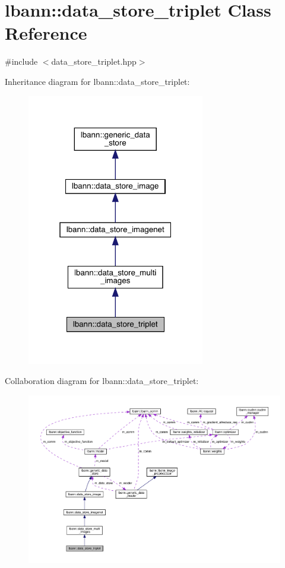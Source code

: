 \hypertarget{classlbann_1_1data__store__triplet}{}\section{lbann\+:\+:data\+\_\+store\+\_\+triplet Class Reference}
\label{classlbann_1_1data__store__triplet}


{\ttfamily \#include $<$data\+\_\+store\+\_\+triplet.\+hpp$>$}



Inheritance diagram for lbann\+:\+:data\+\_\+store\+\_\+triplet\+:\nopagebreak
\begin{figure}[H]
\begin{center}
\leavevmode
\includegraphics[width=220pt]{classlbann_1_1data__store__triplet__inherit__graph}
\end{center}
\end{figure}


Collaboration diagram for lbann\+:\+:data\+\_\+store\+\_\+triplet\+:\nopagebreak
\begin{figure}[H]
\begin{center}
\leavevmode
\includegraphics[width=350pt]{classlbann_1_1data__store__triplet__coll__graph}
\end{center}
\end{figure}
